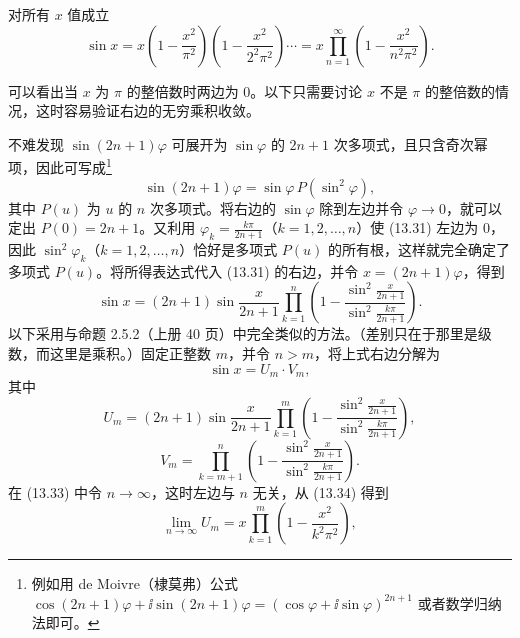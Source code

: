 \begin{xexample}[13.4.3（Euler）]
对所有 $x$ 值成立
\begin{equation}
\sin x=x\left(1-\frac{x^2}{\pi^2}\right)\left(1-\frac{x^2}{2^2\pi^2}\right)\cdots
=x\prod_{n=1}^{\infty}\left(1-\frac{x^2}{n^2\pi^2}\right).
\tag{13.30}
\end{equation}
\end{xexample}
\begin{xproof}
可以看出当 $x$ 为 $\pi$ 的整倍数时两边为 0。以下只需要讨论 $x$ 不是 $\pi$ 的整倍数的情况，这时容易验证右边的无穷乘积收敛。

不难发现 $\sin(2n+1)\varphi$ 可展开为 $\sin\varphi$ 的 $2n+1$ 次多项式，且只含奇次幂项，因此可写成\footnote{例如用 de Moivre（棣莫弗）公式 $\cos(2n+1)\varphi+\ii\sin(2n+1)\varphi=(\cos\varphi+\ii\sin\varphi)^{2n+1}$ 或者数学归纳法即可。}
\begin{equation}
\sin(2n+1)\varphi=\sin\varphi\,P(\sin^2\varphi),
\tag{13.31}
\end{equation}
其中 $P(u)$ 为 $u$ 的 $n$ 次多项式。将右边的 $\sin\varphi$ 除到左边并令 $\varphi\to0$，就可以定出 $P(0)=2n+1$。又利用 $\varphi_k=\frac{k\pi}{2n+1}$（$k=1,2,\ldots,n$）使 (13.31) 左边为 0，因此 $\sin^2\varphi_k$（$k=1,2,\ldots,n$）恰好是多项式 $P(u)$ 的所有根，这样就完全确定了多项式 $P(u)$。将所得表达式代入 (13.31) 的右边，并令 $x=(2n+1)\varphi$，得到
\begin{equation}
\sin x=(2n+1)\sin\frac{x}{2n+1}\prod_{k=1}^{n}\left(1-\frac{\sin^2\frac{x}{2n+1}}{\sin^2\frac{k\pi}{2n+1}}\right).
\tag{13.32}
\end{equation}
以下采用与命题 2.5.2（上册 40 页）中完全类似的方法。（差别只在于那里是级数，而这里是乘积。）固定正整数 $m$，并令 $n>m$，将上式右边分解为
\begin{equation}
\sin x=U_m\cdot V_m,
\tag{13.33}
\end{equation}
其中
\begin{equation}
U_m=(2n+1)\sin\frac{x}{2n+1}\prod_{k=1}^{m}\left(1-\frac{\sin^2\frac{x}{2n+1}}{\sin^2\frac{k\pi}{2n+1}}\right),
\tag{13.34}
\end{equation}
\begin{equation}
V_m=\prod_{k=m+1}^{n}\left(1-\frac{\sin^2\frac{x}{2n+1}}{\sin^2\frac{k\pi}{2n+1}}\right).
\tag{13.35}
\end{equation}
在 (13.33) 中令 $n\to\infty$，这时左边与 $n$ 无关，从 (13.34) 得到
\begin{equation}
\lim_{n\to\infty}U_m=x\prod_{k=1}^{m}\left(1-\frac{x^2}{k^2\pi^2}\right),
\tag{13.36}
\end{equation}

\end{xproof}
